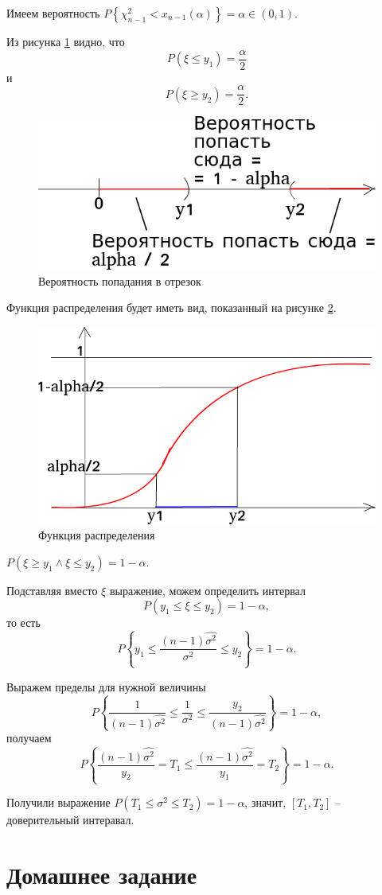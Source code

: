 \begin{enumerate}[label=\alph*)]
  Имеем вероятность
  $P \left\{ \chi_{n - 1}^2 < x_{n - 1} \left( \alpha \right) \right\} =
    \alpha \in \left( 0, 1 \right) $.

  Из рисунка \ref{fig:103} видно, что
  $$P \left( \xi \leq y_1 \right) =
    \frac{ \alpha }{2}$$
  и
  $$P \left( \xi \geq y_2 \right) =
    \frac{ \alpha }{2}.$$

  \begin{figure}[h!]
    \centering
    \includegraphics[width=.4\textwidth]{./pictures/10_3.png}
    \caption{Вероятность попадания в отрезок}
    \label{fig:103}
  \end{figure}

  Функция распределения будет иметь вид, показанный на рисунке \ref{fig:1031}.

  \begin{figure}[h!]
    \centering
    \includegraphics[width=.4\textwidth]{./pictures/10_3_1.png}
    \caption{Функция распределения}
    \label{fig:1031}
  \end{figure}

  $P \left( \xi \geq y_1 \wedge \xi \leq y_2 \right) = 1 - \alpha $.

  Подставляя вместо $ \xi $ выражение,
  можем определить интервал
  $$P \left( y_1 \leq \xi \leq y_2 \right) =
    1 - \alpha,$$
  то есть
  $$P \left\{ y_1 \leq \frac{ \left( n - 1 \right) \hat{ \sigma^2}}{ \sigma^2} \leq y_2 \right\} =
    1 - \alpha.$$

  Выражем пределы для нужной величины
  $$P \left\{
      \frac{1}{ \left( n - 1 \right) \hat{ \sigma^2}} \leq \frac{1}{ \sigma^2} \leq
      \frac{y_2}{ \left( n - 1 \right) \hat{ \sigma^2}}
    \right\} =
    1 - \alpha,$$
  получаем
  $$P \left\{
      \frac{ \left( n - 1 \right) \hat{ \sigma^2}}{y_2} = T_1 \leq
      \frac{ \left( n - 1 \right) \hat{ \sigma^2}}{y_1} = T_2
    \right\} =
    1 - \alpha.$$

  Получили выражение $P \left( T_1 \leq \sigma^2 \leq T_2 \right) = 1 - \alpha $, значит,
  $ \left[ T_1, T_2 \right] $ -- доверительный интеравал.
\end{enumerate}

\section*{Домашнее задание}
